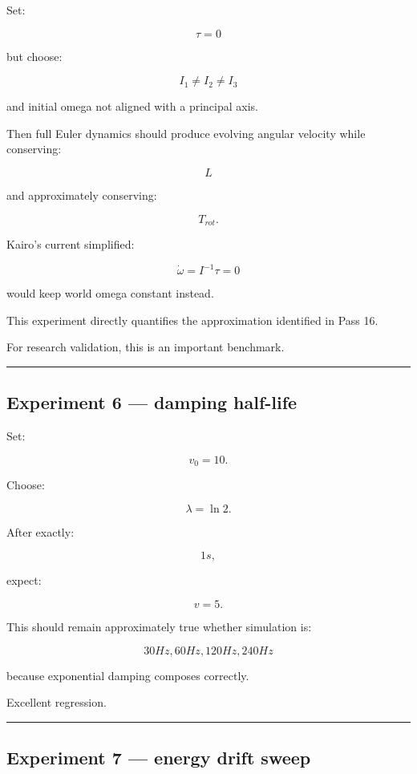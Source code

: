 Set:

\[
\tau=0
\]

but choose:

\[
I_1\neq I_2\neq I_3
\]

and initial omega not aligned with a principal axis.

Then full Euler dynamics should produce evolving angular velocity while conserving:

\[
L
\]

and approximately conserving:

\[
T_{rot}.
\]

Kairo's current simplified:

\[
\dot\omega=I^{-1}\tau=0
\]

would keep world omega constant instead.

This experiment directly quantifies the approximation identified in Pass 16.

For research validation, this is an important benchmark.

\begin{center}\rule{0.5\linewidth}{0.5pt}\end{center}

\subsection{Experiment 6 --- damping half-life}\label{06-engine-ii-ch039-experiment-6-damping-half-life}

\hypertarget{06-engine-ii-ch039-experiment-6-damping-half-life}{}

Set:

\[
v_0=10.
\]

Choose:

\[
\lambda=\ln2.
\]

After exactly:

\[
1s,
\]

expect:

\[
v=5.
\]

This should remain approximately true whether simulation is:

\[
30Hz,
60Hz,
120Hz,
240Hz
\]

because exponential damping composes correctly.

Excellent regression.

\begin{center}\rule{0.5\linewidth}{0.5pt}\end{center}

\subsection{Experiment 7 --- energy drift sweep}\label{06-engine-ii-ch039-experiment-7-energy-drift-sweep}

